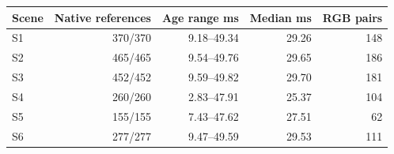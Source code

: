 \begin{tabular}{lrrrr}
\toprule
Scene & Native references & Age range ms & Median ms & RGB pairs \\
\midrule
S1 & 370/370 & 9.18--49.34 & 29.26 & 148 \\
S2 & 465/465 & 9.54--49.76 & 29.65 & 186 \\
S3 & 452/452 & 9.59--49.82 & 29.70 & 181 \\
S4 & 260/260 & 2.83--47.91 & 25.37 & 104 \\
S5 & 155/155 & 7.43--47.62 & 27.51 & 62 \\
S6 & 277/277 & 9.47--49.59 & 29.53 & 111 \\
\bottomrule
\end{tabular}
